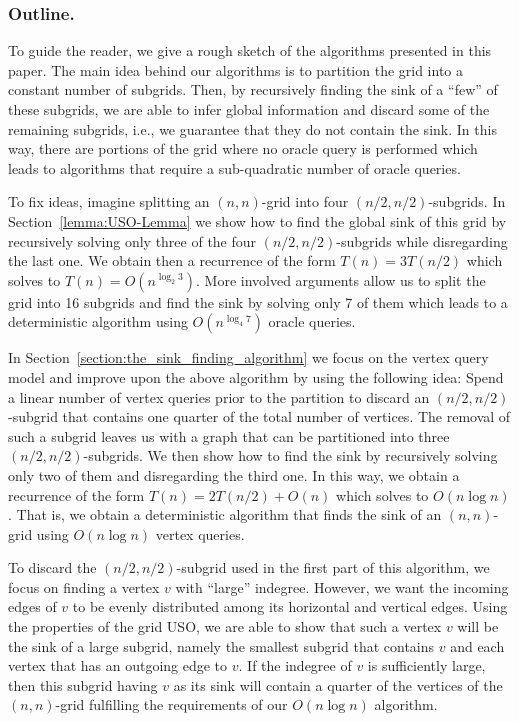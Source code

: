 \documentclass[runningheads,a4paper]{llncs}
\begin{document}
\subsubsection{Outline.}
To guide the reader, we give a rough sketch of the algorithms presented in this paper.
The main idea behind our algorithms is to partition the grid into a constant number of subgrids. 
Then, by recursively finding the sink of a ``few'' of these subgrids, we are able to infer global information and discard some of the remaining subgrids, i.e., we guarantee that they do not contain the sink. 
In this way, there are portions of the grid where no oracle query is performed which leads to algorithms that require a sub-quadratic number of oracle queries.

To fix ideas, imagine splitting an $(n,n)$-grid into four $(n/2, n/2)$-subgrids. 
In Section~\ref{lemma:USO-Lemma} we show how to find the global sink of this grid by recursively solving only three of the four $(n/2, n/2)$-subgrids while disregarding the last one. 
We obtain then a recurrence of the form $T(n) = 3 T(n/2)$ which solves to $T(n) = O(n^{\log_2 3})$.
More involved arguments allow us to split the grid into 16 subgrids and find the sink by solving only 7 of them which leads to a deterministic algorithm using $O(n^{\log_4 7})$ oracle queries.

In Section~\ref{section:the_sink_finding_algorithm} we focus on the vertex query model and improve upon the above algorithm by using the following idea: Spend a linear number of vertex queries prior to the partition to discard an $(n/2, n/2)$-subgrid that contains one quarter of the total number of vertices. 
The removal of such a subgrid leaves us with a graph that can be partitioned into three $(n/2, n/2)$-subgrids. 
We then show how to find the sink by recursively solving only two of them and disregarding the third one. In this way, we obtain a recurrence of the form $T(n) = 2 T(n/2) + O(n)$ which solves to $O(n \log n)$. 
That is, we obtain a deterministic algorithm that finds the sink of an $(n, n)$-grid using $O(n \log n)$ vertex queries. 

To discard the $(n/2, n/2)$-subgrid used in the first part of this algorithm, we focus on finding a vertex $v$ with ``large'' indegree. 
However, we want the incoming edges of $v$ to be evenly distributed among its horizontal and vertical edges. Using the properties of the grid USO, we are able to show that such a vertex $v$ will be the sink of a large subgrid, namely the smallest subgrid that contains $v$ and each vertex that has an outgoing edge to $v$.
If the indegree of $v$ is sufficiently large, then this subgrid having $v$ as its sink will contain a quarter of the vertices of the $(n,n)$-grid fulfilling the requirements of our $O(n \log n)$ algorithm.
\end{document}
